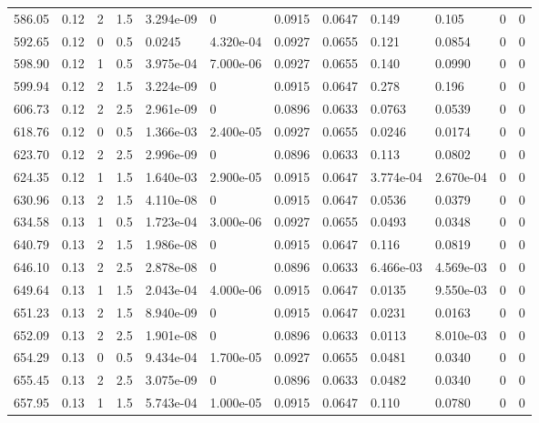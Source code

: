 \documentclass[preview]{standalone}
\begin{document}
{{{{\begin{tabular}{L{1.2cm}C{1.2cm} C{0.3cm}C{0.5cm} C{1.4cm}C{1.4cm} C{1.4cm}C{1.4cm} C{1.6cm}C{1.6cm} C{1.6cm}C{1.6cm}}
  586.05  &  0.12  & 2     & 1.5 &  3.294e-09  & 0  &  0.0915&   0.0647& 0.149 & 0.105   &  0 & 0  \\ 
  592.65  &  0.12  & 0     & 0.5 &  0.0245  & 4.320e-04  &  0.0927&   0.0655& 0.121 & 0.0854   &  0 & 0  \\ 
  598.90  &  0.12  & 1     & 0.5 &  3.975e-04  & 7.000e-06  &  0.0927&   0.0655& 0.140 & 0.0990   &  0 & 0  \\ 
  599.94  &  0.12  & 2     & 1.5 &  3.224e-09  & 0  &  0.0915&   0.0647& 0.278 & 0.196   &  0 & 0  \\ 
  606.73  &  0.12  & 2     & 2.5 &  2.961e-09  & 0  &  0.0896&   0.0633& 0.0763 & 0.0539   &  0 & 0  \\ 
  618.76  &  0.12  & 0     & 0.5 &  1.366e-03  & 2.400e-05  &  0.0927&   0.0655& 0.0246 & 0.0174   &  0 & 0  \\ 
  623.70  &  0.12  & 2     & 2.5 &  2.996e-09  & 0  &  0.0896&   0.0633& 0.113 & 0.0802   &  0 & 0  \\ 
  624.35  &  0.12  & 1     & 1.5 &  1.640e-03  & 2.900e-05  &  0.0915&   0.0647& 3.774e-04 & 2.670e-04   &  0 & 0  \\ 
  630.96  &  0.13  & 2     & 1.5 &  4.110e-08  & 0  &  0.0915&   0.0647& 0.0536 & 0.0379   &  0 & 0  \\ 
  634.58  &  0.13  & 1     & 0.5 &  1.723e-04  & 3.000e-06  &  0.0927&   0.0655& 0.0493 & 0.0348   &  0 & 0  \\ 
  640.79  &  0.13  & 2     & 1.5 &  1.986e-08  & 0  &  0.0915&   0.0647& 0.116 & 0.0819   &  0 & 0  \\ 
  646.10  &  0.13  & 2     & 2.5 &  2.878e-08  & 0  &  0.0896&   0.0633& 6.466e-03 & 4.569e-03   &  0 & 0  \\ 
  649.64  &  0.13  & 1     & 1.5 &  2.043e-04  & 4.000e-06  &  0.0915&   0.0647& 0.0135 & 9.550e-03   &  0 & 0  \\ 
  651.23  &  0.13  & 2     & 1.5 &  8.940e-09  & 0  &  0.0915&   0.0647& 0.0231 & 0.0163   &  0 & 0  \\ 
  652.09  &  0.13  & 2     & 2.5 &  1.901e-08  & 0  &  0.0896&   0.0633& 0.0113 & 8.010e-03   &  0 & 0  \\ 
  654.29  &  0.13  & 0     & 0.5 &  9.434e-04  & 1.700e-05  &  0.0927&   0.0655& 0.0481 & 0.0340   &  0 & 0  \\ 
  655.45  &  0.13  & 2     & 2.5 &  3.075e-09  & 0  &  0.0896&   0.0633& 0.0482 & 0.0340   &  0 & 0  \\ 
  657.95  &  0.13  & 1     & 1.5 &  5.743e-04  & 1.000e-05  &  0.0915&   0.0647& 0.110 & 0.0780   &  0 & 0  \\ 

\end{tabular}}}}}
\end{document}
